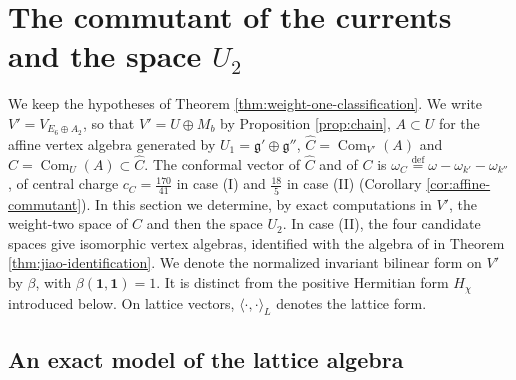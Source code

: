 \documentclass[leqno]{article}
\newcommand{\ov}{\overset}
\numberwithin{equation}{section}
\begin{document}
\section{The commutant of the currents and the space \texorpdfstring{$U_2$}{U2}}
\label{sec:griess}

We keep the hypotheses of Theorem \ref{thm:weight-one-classification}. We write $V' = V_{E_6 \oplus A_2}$, so that $V' = U \oplus M_b$ by Proposition \ref{prop:chain}, $A \subset U$ for the affine vertex algebra generated by $U_1 = \mathfrak g' \oplus \mathfrak g''$, $\widehat C = \operatorname{Com}_{V'}(A)$ and $C = \operatorname{Com}_U(A) \subset \widehat C$. The conformal vector of $\widehat C$ and of $C$ is $\omega_C \ov{\mathrm{def}}{=} \omega-\omega_{k'}-\omega_{k''}$, of central charge $c_C = \frac{170}{41}$ in case (I) and $\frac{18}{5}$ in case (II) (Corollary \ref{cor:affine-commutant}). In this section we determine, by exact computations in $V'$, the weight-two space of $C$ and then the space $U_2$. In case (II), the four candidate spaces give isomorphic vertex algebras, identified with the algebra of \cite{Jia26} in Theorem \ref{thm:jiao-identification}. We denote the normalized invariant bilinear form on $V'$ by $\beta$, with $\beta(\mathbf 1,\mathbf 1) = 1$. It is distinct from the positive Hermitian form $H_\chi$ introduced below. On lattice vectors, $\langle\cdot,\cdot\rangle_L$ denotes the lattice form.

\subsection{An exact model of the lattice algebra}
\end{document}
